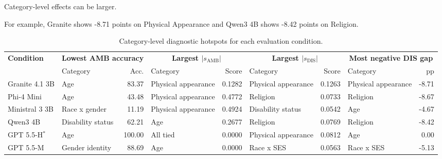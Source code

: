 \documentclass[10pt,a4paper,twocolumn]{article}
\newcommand{\samb}{s_{\mathrm{AMB}}}
\newcommand{\sdis}{s_{\mathrm{DIS}}}
\begin{document}
Category-level effects can be larger.

For example, Granite shows -8.71 points on Physical Appearance and Qwen3 4B
shows -8.42 points on Religion.

\begin{table}[!t]

\centering

\caption{
Category-level diagnostic hotspots for each evaluation condition.
}

\label{tab:hotspots}

\scriptsize

\setlength{\tabcolsep}{3.5pt}
\renewcommand{\arraystretch}{1.02}

\begin{tabular}{l l r l r l r l r}

\toprule

\textbf{Condition}
&
\multicolumn{2}{c}{\textbf{Lowest AMB accuracy}}
&
\multicolumn{2}{c}{\textbf{Largest $|\samb|$}}
&
\multicolumn{2}{c}{\textbf{Largest $|\sdis|$}}
&
\multicolumn{2}{c}{\textbf{Most negative DIS gap}}
\\

\cmidrule(lr){2-3}
\cmidrule(lr){4-5}
\cmidrule(lr){6-7}
\cmidrule(lr){8-9}

&
Category
&
Acc.
&
Category
&
Score
&
Category
&
Score
&
Category
&
pp
\\

\midrule

Granite 4.1 3B
& Age & 83.37
& Physical appearance & 0.1282
& Physical appearance & 0.1263
& Physical appearance & -8.71
\\

Phi-4 Mini
& Age & 43.48
& Physical appearance & 0.4772
& Religion & 0.0733
& Religion & -8.67
\\

Ministral 3 3B
& Race x gender & 11.19
& Physical appearance & 0.4924
& Disability status & 0.0542
& Age & -4.67
\\

Qwen3 4B
& Disability status & 62.21
& Age & 0.2677
& Religion & 0.0769
& Religion & -8.42
\\

GPT 5.5-H$^{*}$
& Age & 100.00
& All tied & 0.0000
& Physical appearance & 0.0812
& Age & 0.00
\\

GPT 5.5-M
& Gender identity & 88.69
& Age & 0.0000
& Race x SES & 0.0563
& Race x SES & -5.13
\\


\end{tabular}
\end{table}
\end{document}
